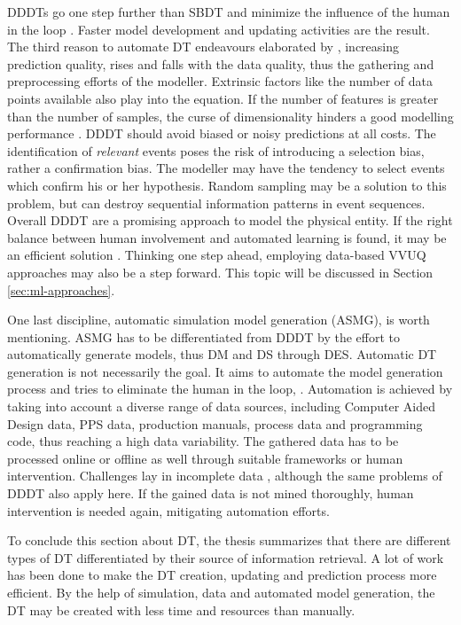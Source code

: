 DDDTs go one step further than SBDT and minimize the influence of the human in the loop \autocite{francis2021towards,Friederich2022}. Faster model development and updating activities are the result. The third reason to automate DT endeavours elaborated by \citeauthor{schwede2024learning}, increasing prediction quality, rises and falls with the data quality, thus the gathering and preprocessing efforts of the modeller. Extrinsic factors like the number of data points available also play into the equation. If the number of features is greater than the number of samples, the curse of dimensionality hinders a good modelling performance \autocite{koppen2000curse}. DDDT should avoid biased or noisy predictions at all costs. The identification of \textit{relevant} events poses the risk of introducing a selection bias, rather a confirmation bias. The modeller may have the tendency to select events which confirm his or her hypothesis. Random sampling may be a solution to this problem, but can destroy sequential information patterns in event sequences. Overall DDDT are a promising approach to model the physical entity. If the right balance between human involvement and automated learning is found, it may be an efficient solution \autocite{francis2021towards}. Thinking one step ahead, employing data-based VVUQ approaches may also be a step forward. This topic will be discussed in Section \autoref{sec:ml-approaches}.

\label{par:asmg}
One last discipline, automatic simulation model generation (ASMG), is worth mentioning. ASMG has to be differentiated from DDDT by the effort to automatically generate models, thus DM and DS through DES. Automatic DT generation is not necessarily the goal. It aims to automate the model generation process and tries to eliminate the human in the loop, \autocite{reinhardt2019survey,lechevalier2018methodology}. Automation is achieved by taking into account a diverse range of data sources, including Computer Aided Design data, PPS data, production manuals, process data and programming code, thus reaching a high data variability. The gathered data has to be processed online or offline as well through suitable frameworks or human intervention. Challenges lay in incomplete data \autocite{bergmann2014automatische}, although the same problems of DDDT also apply here. If the gained data is not mined thoroughly, human intervention is needed again, mitigating automation efforts.

To conclude this section about DT, the thesis summarizes that there are different types of DT differentiated by their source of information retrieval. A lot of work has been done to make the DT creation, updating and prediction process more efficient. By the help of simulation, data and automated model generation, the DT may be created with less time and resources than manually.

